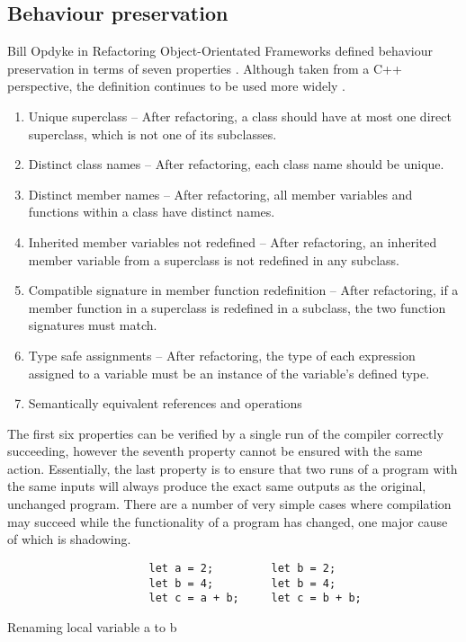 \subsection{Behaviour preservation}
Bill Opdyke in Refactoring Object-Orientated Frameworks defined behaviour preservation in terms of seven properties \cite{opdyke1992refactoring}. Although taken from a C++ perspective, the definition continues to be used more widely \cite{schafer2010specification}.

\begin{enumerate}
\item Unique superclass -- After refactoring, a class should have at most one direct superclass, which is not one of its subclasses.
\item Distinct class names -- After refactoring, each class name should be unique.
\item Distinct member names --  After refactoring, all member variables and functions within a class have distinct names.
\item Inherited member variables not redefined -- After refactoring, an inherited member variable from a superclass is not redefined in any subclass.
\item Compatible signature in member function redefinition -- After refactoring, if a member function in a superclass is redefined in a subclass, the two function signatures must match.
\item Type safe assignments -- After refactoring, the type of each expression assigned to a variable must be an instance of the variable's defined type.
\item Semantically equivalent references and operations
\end{enumerate}

The first six properties can be verified by a single run of the compiler correctly succeeding, however the seventh property cannot be ensured with the same action. Essentially, the last property is to ensure that two runs of a program with the same inputs will always produce the exact same outputs as the original, unchanged program. There are a number of very simple cases where compilation may succeed while the functionality of a program has changed, one major cause of which is shadowing. 

\begin{fig}
\begin{verbatim}
                      let a = 2;         let b = 2;
                      let b = 4;         let b = 4;
                      let c = a + b;     let c = b + b;
\end{verbatim}
\caption{Renaming local variable a to b}
\label{Fig:opdyke}
\end{fig}

